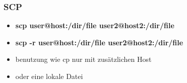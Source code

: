 \begin{frame}
\frametitle{SCP}
\begin{itemize}
\item \textbf{scp user@host:/dir/file user2@host2:/dir/file}
\pause
\item \textbf{scp -r user@host:/dir/file user2@host2:/dir/file}
\pause
\item benutzung wie cp nur mit zusätzlichen Host
\pause
\item oder eine lokale Datei
\end{itemize}
\end{frame}